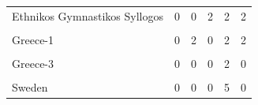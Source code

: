 \documentclass[
]{article}
\begin{document}
\begin{table}[H]
\begin{tabular}[t]{lrrrrr}
Ethnikos Gymnastikos Syllogos & 0 & 0 & 2 & 2 & 2\\
\cellcolor{gray!10}{Great Britain/Germany} & \cellcolor{gray!10}{2} & \cellcolor{gray!10}{0} & \cellcolor{gray!10}{0} & \cellcolor{gray!10}{2} & \cellcolor{gray!10}{2}\\
Greece-1 & 0 & 2 & 0 & 2 & 2\\
\cellcolor{gray!10}{Greece-2} & \cellcolor{gray!10}{0} & \cellcolor{gray!10}{0} & \cellcolor{gray!10}{0} & \cellcolor{gray!10}{2} & \cellcolor{gray!10}{0}\\
\addlinespace
Greece-3 & 0 & 0 & 0 & 2 & 0\\
\cellcolor{gray!10}{Italy} & \cellcolor{gray!10}{0} & \cellcolor{gray!10}{0} & \cellcolor{gray!10}{0} & \cellcolor{gray!10}{1} & \cellcolor{gray!10}{0}\\
Sweden & 0 & 0 & 0 & 5 & 0\\
\bottomrule
\end{tabular}
\end{table}

\newpage
\end{document}
